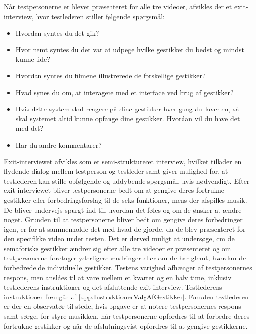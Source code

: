 Når testpersonerne er blevet præsenteret for alle tre videoer, afvikles der et exit-interview, hvor testlederen stiller følgende spørgsmål:\blankline
%
\begin{itemize}
  \item Hvordan syntes du det gik? 
  \item Hvor nemt syntes du det var at udpege hvilke gestikker du bedst og mindst kunne lide? 
  \item Hvordan syntes du filmene illustrerede de forskellige gestikker? 
  \item Hvad synes du om, at interagere med et interface ved brug af gestikker? 
  \item Hvis dette system skal reagere på dine gestikker hver gang du laver en, så skal systemet altid kunne opfange dine gestikker. Hvordan vil du have det med det? 
  \item Har du andre kommentarer?\blankline
\end{itemize}
\noindent
%
Exit-interviewet afvikles som et semi-struktureret interview, hvilket tillader en flydende dialog mellem testperson og testleder samt giver mulighed for, at testlederen kan stille opfølgende og uddybende spørgsmål, hvis nødvendigt. Efter exit-interviewet bliver testpersonerne bedt om at gengive deres fortrukne gestikker eller forbedringsforslag til de seks funktioner, mens der afspilles musik. De bliver undervejs spurgt ind til, hvordan det føles og om de ønsker at ændre noget. Grunden til at testpersonerne bliver bedt om gengive deres forbedringer igen, er for at sammenholde det med hvad de gjorde, da de blev præsenteret for den specifikke video under testen. Det er derved muligt at undersøge, om de semaforiske gestikker ændrer sig efter alle tre videoer er præsenteret og om testpersonerne foretager yderligere ændringer eller om de har glemt, hvordan de forbedrede de individuelle gestikker. \blankline   
%
Testens varighed afhænger af testpersonernes respons, men anslåes til at vare mellem et kvarter og en halv time, inklusiv testlederens instruktioner og det afsluttende exit-interview. Testlederens instruktioner fremgår af \autoref{app:InstruktionerValgAfGestikker}. Foruden testlederen er der en observatør til stede, hvis opgave er at notere testpersonernes respons samt sørger for styre musikken, når testpersonerne opfordres til at forbedre deres fortrukne gestikker og når de afslutningsvist opfordres til at gengive gestikkerne. 
%
